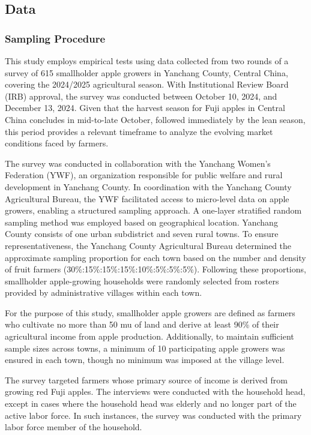 \subsection{Data}
\subsubsection{Sampling Procedure}
\noindent This study employs empirical tests using data collected from two rounds of a survey of 615 smallholder apple growers in Yanchang County, Central China, covering the 2024/2025 agricultural season. With Institutional Review Board (IRB) approval, the survey was conducted between October 10, 2024, and December 13, 2024. Given that the harvest season for Fuji apples in Central China concludes in mid-to-late October, followed immediately by the lean season, this period provides a relevant timeframe to analyze the evolving market conditions faced by farmers.

The survey was conducted in collaboration with the Yanchang Women's Federation (YWF), an organization responsible for public welfare and rural development in Yanchang County. In coordination with the Yanchang County Agricultural Bureau, the YWF facilitated access to micro-level data on apple growers, enabling a structured sampling approach. A one-layer stratified random sampling method was employed based on geographical location. Yanchang County consists of one urban subdistrict and seven rural towns. To ensure representativeness, the Yanchang County Agricultural Bureau determined the approximate sampling proportion for each town based on the number and density of fruit farmers (30\%:15\%:15\%:15\%:10\%:5\%:5\%:5\%). Following these proportions, smallholder apple-growing households were randomly selected from rosters provided by administrative villages within each town.

For the purpose of this study, smallholder apple growers are defined as farmers who cultivate no more than 50 mu of land and derive at least 90\% of their agricultural income from apple production. Additionally, to maintain sufficient sample sizes across towns, a minimum of 10 participating apple growers was ensured in each town, though no minimum was imposed at the village level.

The survey targeted farmers whose primary source of income is derived from growing red Fuji apples. The interviews were conducted with the household head, except in cases where the household head was elderly and no longer part of the active labor force. In such instances, the survey was conducted with the primary labor force member of the household.



